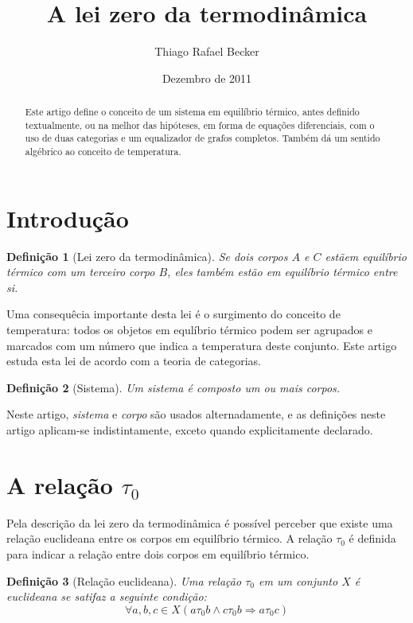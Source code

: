 \documentclass[a4paper]{article}
\title{A lei zero da termodinâmica}
\author{Thiago Rafael Becker}
\date{Dezembro de 2011}
\newcommand{\trls}{{\tau_0}}
\newcommand{\trl}[2]{{#1 \trls #2}}
\newtheorem{definicao}{Definição}[section]
\begin{document}
\maketitle
\begin{abstract}
Este artigo define o conceito de um sistema em equilíbrio térmico, antes definido textualmente, ou na melhor das hipóteses, em forma de equações diferenciais, com o uso de duas categorias e um equalizador de grafos completos. Também dá um sentido algébrico ao conceito de temperatura.
\end{abstract}

\section*{Introdução}
\begin{definicao}[Lei zero da termodinâmica] \label{def:0th}
Se dois corpos $A$ e $C$ estãem equilíbrio térmico com um terceiro corpo $B$, eles também estão em equilíbrio térmico entre si.
\end{definicao}
Uma consequêcia importante desta lei é o surgimento do conceito de temperatura: todos os objetos em equlíbrio térmico podem ser agrupados e marcados com um número que indica a temperatura deste conjunto. Este artigo estuda esta lei de acordo com a teoria de categorias.

\begin{definicao}[Sistema] \label{def:sistema}
Um sistema é composto um ou mais corpos.
\end{definicao}

Neste artigo, {\it sistema} e {\it corpo} são usados alternadamente, e as definições neste artigo aplicam-se indistintamente, exceto quando explicitamente declarado.

\section*{A relação $\trls$}
Pela descrição da lei zero da termodinâmica é possível perceber que existe uma relação euclideana entre os corpos em equilíbrio térmico. A relação $\trls$ é definida para indicar a relação entre dois corpos em equilíbrio térmico.

\begin{definicao}[Relação euclideana]  \label{def:euclidean}
Uma relação $\trls$ em um conjunto $X$ é euclideana se satifaz a seguinte condição:
\begin{equation}
\forall a, b, c \in X (\trl{a}{b} \wedge \trl{c}{b} \Rightarrow \trl{a}{c})
\end{equation}
\end{definicao}
\end{document}
